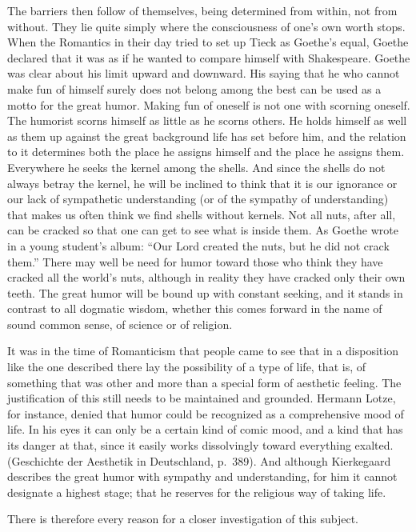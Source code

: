 \documentclass[12pt]{book}
\newcommand{\opage}[1]{\marginnote{\footnotesize\textit{[#1]}}}
\begin{document}
The barriers then follow of themselves, being determined from within, not from
without. They lie quite simply where the consciousness of one's own worth stops.
When the Romantics in their day tried to set up Tieck as Goethe's equal, Goethe
declared that it was as if he wanted to compare himself with Shakespeare. Goethe
was clear about his limit upward and downward. His saying that he who cannot make
fun of himself surely does not belong among the best can be used as a motto for the
great humor. Making fun of oneself is not one with scorning oneself. The humorist
scorns himself as little as he scorns others. He holds himself as well as them up
against the great background life has set before him, and the relation to it
determines both the place he assigns himself and the place he assigns them.
Everywhere he seeks the kernel among the shells. And since the shells do not always
betray the kernel, he will be inclined to think that it is our ignorance or our lack
of sympathetic understanding (or of the sympathy of understanding) that makes us
often think we find shells without kernels. Not all nuts, after all, can be cracked
so that one can get to see what is inside them. As Goethe wrote in a young student's
album: ``Our Lord created the nuts, but he did not crack them.'' There may well be
need for \opage{58}humor toward those who think they have cracked all the world's
nuts, although in reality they have cracked only their own teeth. The great humor
will be bound up with constant seeking, and it stands in contrast to all dogmatic
wisdom, whether this comes forward in the name of sound common sense, of science or
of religion.

It was in the time of Romanticism that people came to see that in a disposition
like the one described there lay the possibility of a type of life, that is, of
something that was other and more than a special form of aesthetic feeling. The
justification of this still needs to be maintained and grounded. Hermann Lotze, for
instance, denied that humor could be recognized as a comprehensive mood of life. In
his eyes it can only be a certain kind of comic mood, and a kind that has its danger
at that, since it easily works dissolvingly toward everything exalted. (Geschichte
der Aesthetik in Deutschland, p.~389). And although Kierkegaard describes the great
humor with sympathy and understanding, for him it cannot designate a highest stage;
that he reserves for the religious way of taking life.

There is therefore every reason for a closer investigation of this subject.
\end{document}
